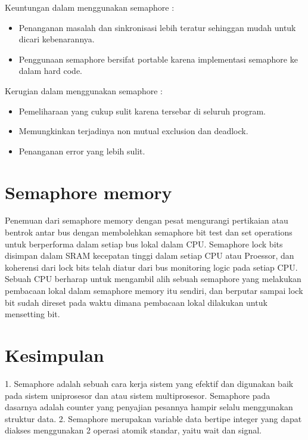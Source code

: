 Keuntungan dalam menggunakan semaphore :

\begin{itemize}
	\item Penanganan masalah dan sinkronisasi lebih teratur sehinggan mudah untuk dicari kebenarannya.
	\item Penggunaan semaphore bersifat portable karena implementasi semaphore ke dalam hard code.
\end{itemize}
	
	Kerugian dalam menggunakan semaphore :
	
	\begin{itemize}
		\item Pemeliharaan yang cukup sulit karena tersebar di seluruh program.
		\item Memungkinkan terjadinya non  mutual exclusion dan deadlock.
		\item Penanganan error yang lebih sulit.
	\end{itemize}
\section{Semaphore memory}
\cite{earnshaw1991semaphore}Penemuan dari semaphore memory dengan pesat mengurangi pertikaian atau bentrok antar bus dengan membolehkan semaphore bit test dan set operations untuk berperforma dalam setiap bus lokal dalam CPU. Semaphore lock bits disimpan dalam SRAM kecepatan tinggi dalam setiap CPU atau Proessor, dan koherensi dari 
lock bits telah diatur dari bus monitoring logic pada setiap CPU. Sebuah CPU berharap untuk mengambil alih sebuah semaphore yang melakukan pembacaan lokal dalam semaphore memory itu sendiri, dan berputar sampai lock bit sudah direset pada waktu dimana pembacaan lokal dilakukan untuk mensetting bit.

\section {Kesimpulan}
1. Semaphore adalah sebuah cara kerja sistem yang efektif dan digunakan baik pada sistem uniprosesor dan atau sistem multiprosesor. Semaphore pada dasarnya adalah counter yang penyajian pesannya hampir selalu menggunakan struktur data.
2. Semaphore merupakan variable data bertipe integer yang dapat diakses menggunakan 2 operasi atomik standar, yaitu wait dan signal.
